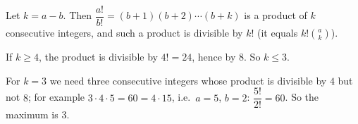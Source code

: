 Let $k=a-b$. Then $\dfrac{a!}{b!}=(b+1)(b+2)\cdots(b+k)$ is a product of $k$ consecutive integers, and such a product is divisible by $k!$ (it equals $k!\binom{a}{k}$).

If $k\ge4$, the product is divisible by $4!=24$, hence by $8$. So $k\le3$.

For $k=3$ we need three consecutive integers whose product is divisible by $4$ but not $8$; for example $3\cdot4\cdot5=60=4\cdot15$, i.e.\ $a=5$, $b=2$: $\dfrac{5!}{2!}=60$. So the maximum is $\boxed{3}$.
